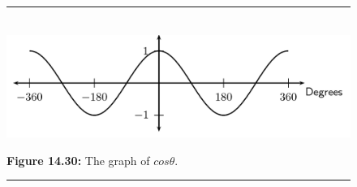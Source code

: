 \begin{figure}[H] %
\begin{center}
\rule[.1in]{\figurerulewidth}{.005in} \\
\label{m39414*uid50!!!underscore!!!media}\label{m39414*uid50!!!underscore!!!printimage}\includegraphics{col11306.imgs/m39414_MG10C15_024.png} %
\vspace{2pt}
\vspace{\rubberspace}\par \begin{cnxcaption}
\small \textbf{Figure 14.30: }The graph of $cos\theta $.
\end{cnxcaption}
\vspace{.1in}
\rule[.1in]{\figurerulewidth}{.005in} \\
\end{center}
\end{figure}       

